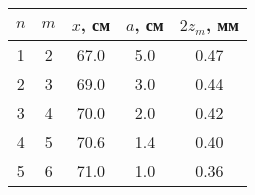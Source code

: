 \begin{tabular}{ccccc}
\toprule
$n$ & $m$ & $x$, см & $a$, см & $2z_m$, мм \\
\midrule
1 & 2 & 67.0 & 5.0 & 0.47 \\
2 & 3 & 69.0 & 3.0 & 0.44 \\
3 & 4 & 70.0 & 2.0 & 0.42 \\
4 & 5 & 70.6 & 1.4 & 0.40 \\
5 & 6 & 71.0 & 1.0 & 0.36 \\ 
\bottomrule
\end{tabular}
